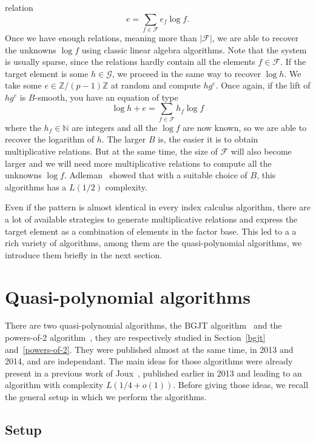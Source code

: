\documentclass[a4paper,11pt]{article}
\theoremstyle{break}
\theoremstyle{sc}
\theoremstyle{definition}
\theoremstyle{remark}
\begin{document}
relation
\[
  e = \sum_{f\in\mathcal F} e_f\log f.
\]
Once we have enough relations, meaning more than $|\mathcal F|$, we are able to
recover the unknowns $\log f$ using classic linear algebra algorithms. Note that
the system is usually sparse, since the relations hardly contain all the
elements $f\in\mathcal F$. If the target element is some $h\in\mathcal G$, we
proceed in the same way to recover $\log h$. We take some
$e\in\mathbb{Z}/(p-1)\mathbb{Z}$ at random and compute $hg^e$. Once again, if
the lift of $hg^e$ is $B$-smooth, you have an equation of type
\[
  \log h + e = \sum_{f\in\mathcal F}h_f\log f
\]
where the $h_f\in\mathbb{N}$ are integers and all the $\log f$ are now known, so
we are able to recover the logarithm of $h$. The larger $B$ is, the easier it is
to obtain multiplicative relations. But at the same time, the size of $\mathcal
F$ will also become larger and we will need more multiplicative relations to
compute all the unknowns $\log f$. Adleman~\cite{Adleman79} showed that with a suitable choice of
$B$, this algorithms has a $L(1/2)$ complexity.

Even if the pattern is almost identical in every index calculus algorithm, there
are a lot of available strategies to generate multiplicative relations and
express the target element as a combination of elements in the factor base. This
led to a a rich variety of algorithms, among them are the quasi-polynomial
algorithms, we introduce them briefly in the next section.

\section{Quasi-polynomial algorithms}
\label{quasi-pol}

There are two quasi-polynomial algorithms, the BGJT algorithm~\cite{BGJT13} and
the powers-of-2 algorithm~\cite{GKZ14}, they are respectively studied in
Section~\ref{bgjt} and~\ref{powers-of-2}. They were published almost at the
same time, in 2013 and 2014, and are independant. 
The main ideas for those algorithms were already present in a
previous work of Joux~\cite{Joux13}, published earlier in 2013 and leading to
an algorithm with complexity $L(1/4 + o(1))$. Before giving those ideas, we
recall the general setup in which we perform the algorithms.

\subsection{Setup}
\label{general-setup}
\end{document}

